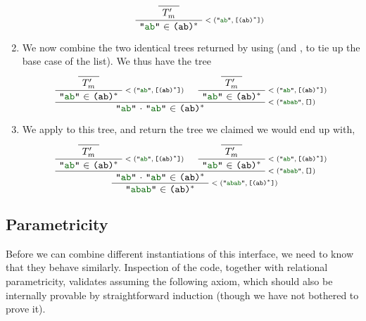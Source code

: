 \begin{enumerate}
\begin{enumerate}
            \[
              \AxiomC{}\UnaryInfC{$T'_m$}
              \RightLabel{\scriptsize\minparsetreeannot{\str{ab}}{\valuelist{\regex{(ab)$^*$}}}}
              \UnaryInfC{\str{ab} $\in$ \regex{(ab)$^*$}}
            \DisplayProof
            \]
        \end{enumerate}
      \item
        We now combine the two identical trees returned by  using  (and , to tie up the base case of the list).  We thus have the tree
        \[
          \AxiomC{}\UnaryInfC{$T'_m$}
          \RightLabel{\scriptsize\minparsetreeannot{\str{ab}}{\valuelist{\regex{(ab)$^*$}}}}
          \UnaryInfC{\str{ab} $\in$ \regex{(ab)$^*$}}
          \AxiomC{}\UnaryInfC{$T'_m$}
          \RightLabel{\scriptsize\minparsetreeannot{\str{ab}}{\valuelist{\regex{(ab)$^*$}}}}
          \UnaryInfC{\str{ab} $\in$ \regex{(ab)$^*$}}
          \RightLabel{\scriptsize\minparsetreeannot{\str{abab}}{\nil}}
          \BinaryInfC{\llstrcat{\str{ab}}{\str{ab}} $\in$ \regex{(ab)$^*$}}
        \DisplayProof
        \]
      \item
        We apply  to this tree, and return the tree we claimed we would end up with,
        \[
          \AxiomC{}\UnaryInfC{$T'_m$}
          \RightLabel{\scriptsize\minparsetreeannot{\str{ab}}{\valuelist{\regex{(ab)$^*$}}}}
          \UnaryInfC{\str{ab} $\in$ \regex{(ab)$^*$}}
          \AxiomC{}\UnaryInfC{$T'_m$}
          \RightLabel{\scriptsize\minparsetreeannot{\str{ab}}{\valuelist{\regex{(ab)$^*$}}}}
          \UnaryInfC{\str{ab} $\in$ \regex{(ab)$^*$}}
          \RightLabel{\scriptsize\minparsetreeannot{\str{abab}}{\nil}}
          \BinaryInfC{\llstrcat{\str{ab}}{\str{ab}} $\in$ \regex{(ab)$^*$}}
          \RightLabel{\scriptsize\minparsetreeannot{\str{abab}}{\valuelist{\regex{(ab)$^*$}}}}
          \UnaryInfC{\str{abab} $\in$ \regex{(ab)$^*$}}
        \DisplayProof
        \]
    \end{enumerate}

  \subsection{Parametricity} \label{sec:parser-extensionality-theorem}
    Before we can combine different instantiations of this interface, we need to know that they behave similarly.  Inspection of the code, together with relational parametricity, validates assuming the following axiom, which should also be internally provable by straightforward induction (though we have not bothered to prove it).  

